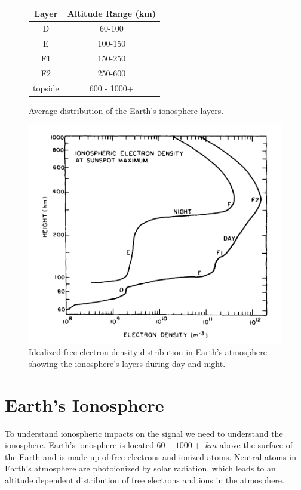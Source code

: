 \begin{figure}[htb]
\centering
\begin{minipage}[b]{0.48\textwidth}
\centering
\begin{tabular}{|c|c|}
\hline
Layer & Altitude Range (km) \\
\hline
D & 60-100 \\
\hline
E & 100-150 \\
\hline
F1 & 150-250 \\
\hline
F2 & 250-600 \\
\hline
topside & 600 - 1000+ \\
\hline
\end{tabular}
\caption{Average distribution of the Earth's ionosphere layers.}
\label{Tab:iono_layer}
\vspace{2cm}
\end{minipage}%
\begin{minipage}[b]{0.02\textwidth}
\hspace{1cm}
\end{minipage}%
\begin{minipage}[b]{0.48\textwidth}
\centering
\includegraphics[width=0.95\linewidth]{Ionosphere/figures/atmosphere_layers.jpg}
\caption{Idealized free electron density distribution in Earth's atmosphere showing the ionosphere's layers during day and night. }
\label{Fig:iono_layer}
\end{minipage}
\end{figure}

\section{Earth's Ionosphere}
To understand ionospheric impacts on the \cm signal we need to understand the ionosphere. Earth's ionosphere is located $60 - 1000+$ $km$ above the surface of the Earth and is made up of free electrons and ionized atoms. Neutral atoms in Earth's atmosphere are photoionized by solar radiation, which leads to an altitude dependent distribution of free electrons and ions in the atmosphere.

